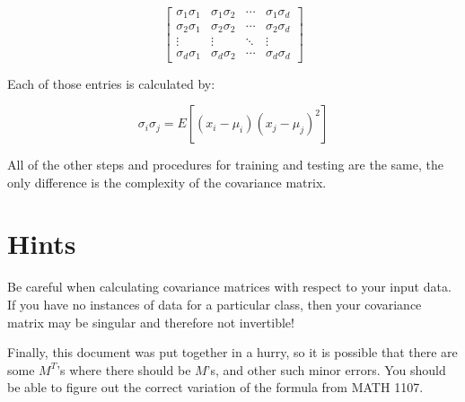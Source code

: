 \documentclass{article}
\begin{document}
\begin{displaymath}
\begin{bmatrix} \sigma_1\sigma_1 & \sigma_1\sigma_2 & \cdots & \sigma_1\sigma_d \\
				 \sigma_2\sigma_1 & \sigma_2\sigma_2 & \cdots & \sigma_2\sigma_d \\
				 \vdots & \vdots & \ddots & \vdots \\
				 \sigma_d\sigma_1 & \sigma_d\sigma_2 & \cdots & \sigma_d\sigma_d
\end{bmatrix}
\end{displaymath}

Each of those entries is calculated by:

\begin{displaymath}
 \sigma_i\sigma_j = E [{(x_i - \mu_i)(x_j - \mu_j)}^2]
\end{displaymath}

All of the other steps and procedures for training and testing are the
same, the only difference is the complexity of the covariance matrix.


\section{Hints}
\label{sec:hints}

Be careful when calculating covariance matrices with respect to your
input data. If you have no instances of data for a particular class,
then your covariance matrix may be singular and therefore not
invertible!

Finally, this document was put together in a hurry, so it is possible
that there are some $M^T$'s where there should be $M$'s, and other
such minor errors.  You should be able to figure out the correct
variation of the formula from MATH 1107.
\end{document}
